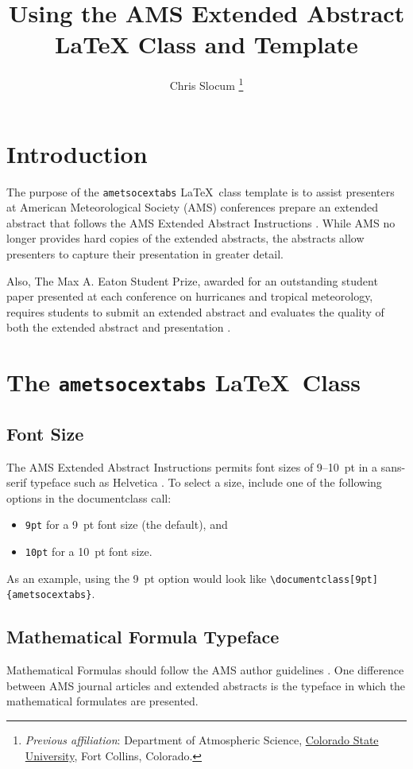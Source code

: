 \documentclass[9pt, blue]{ametsocextabs}
\title{Using the AMS Extended Abstract LaTeX Class and Template}
\author{Chris Slocum\,\orcidlink{0000-0001-6293-7323}\,\aff{a}\thanks{\textit{Previous affiliation}: Department of Atmospheric Science, \href{https://ror.org/03k1gpj17}{Colorado State University}, Fort Collins, Colorado.}\correspondingauthor{Chris Slocum, \url{https://github.com/CSlocumWX/}}
}
\affiliation{\aff{a}{Fort Collins, Colorado}}
\begin{document}
\maketitle
\section{Introduction}
The purpose of the \texttt{ametsocextabs} \LaTeX\ class
template is to assist presenters at American Meteorological Society
(AMS) conferences prepare an extended abstract that follows the AMS
Extended Abstract Instructions \citep{AMS2025abs}. While AMS no
longer provides hard copies of the extended abstracts, the abstracts
allow presenters to capture their presentation in greater detail.

Also, The Max A. Eaton Student Prize, awarded for an outstanding
student paper presented at each conference on hurricanes and tropical
meteorology, requires students to submit an extended abstract and
evaluates the quality of both the extended abstract and presentation
\citep{AMS2025student, AMS2025Eaton}.

\section{The \lowercase{\texttt{ametsocextabs}} \LaTeX\ Class}

\subsection{Font Size}

The AMS Extended Abstract Instructions permits font sizes of 9--10~pt
in a sans-serif typeface such as Helvetica \citep{AMS2025abs}.
To select a size, include one of the following options in the
documentclass call:
\begin{itemize}
    \item \texttt{9pt} for a 9~pt font size (the default), and
    \item \texttt{10pt} for a 10~pt font size.
\end{itemize}
As an example, using the 9~pt option would look like
\texttt{\textbackslash documentclass[9pt]\{ametsocextabs\}}.

\subsection{Mathematical Formula Typeface}
Mathematical Formulas should follow the AMS author guidelines
\citep{AMS2025math}. One difference between AMS journal articles
and extended abstracts is the typeface in which the mathematical
formulates are presented.
\end{document}
